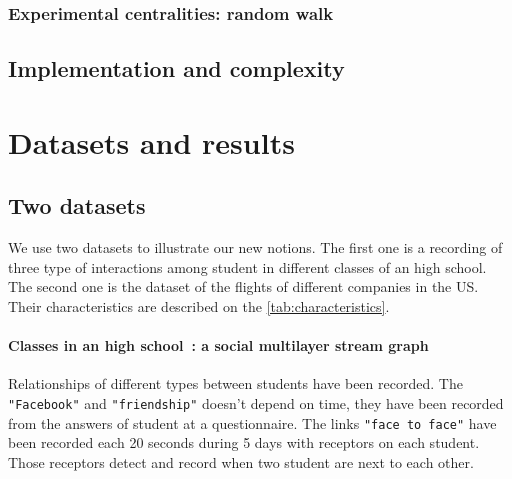 \documentclass{svproc}
\begin{document}
\subsubsection{Experimental centralities: random walk}
%
\subsection{Implementation and complexity}
%


\section{Datasets and results}
%
\subsection{Two datasets}
%
We use two datasets to illustrate our new notions. The first one is a recording of three type of interactions among student in different classes of an high school. The second one is the dataset of the flights of different companies in the US. Their characteristics are described on the \cref{tab:characteristics}.
\paragraph{Classes in an high school~\cite{cpge}: a social multilayer stream graph} Relationships of different types between students have been recorded.  The \texttt{"Facebook"} and \texttt{"friendship"} doesn't depend on time, they have been recorded from the answers of student at a questionnaire. The links \texttt{"face to face"} have been recorded each 20 seconds during 5 days with receptors on each student. Those receptors detect and record when two student are next to each other.
%
\end{document}
